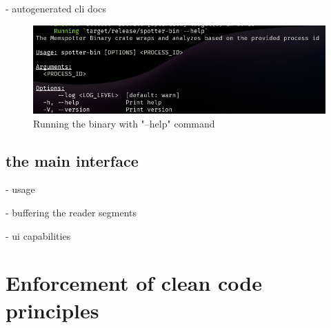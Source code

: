     - autogenerated cli docs

    \begin{figure}
        \centering
        \includegraphics[width=0.5\linewidth]{cli-help.png}
        \caption{Running the binary with "--help" command}
        \label{fig:cli-help}
    \end{figure}

\subsection{the main interface}
- usage

- buffering the reader segments

- ui capabilities


\section{Enforcement of clean code principles}
\label{clean_code}

